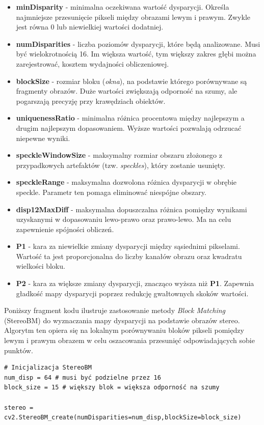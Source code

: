 \documentclass[magisterska]{pracadypl}
\begin{document}
\begin{itemize}
    \item \textbf{minDisparity} - minimalna oczekiwana wartość dysparycji. Określa najmniejsze przesunięcie pikseli między obrazami lewym i prawym. Zwykle jest równa 0 lub niewielkiej wartości dodatniej.
    \item \textbf{numDisparities} - liczba poziomów dysparycji, które będą analizowane. Musi być wielokrotnością 16. Im większa wartość, tym większy zakres głębi można zarejestrować, kosztem wydajności obliczeniowej.
    \item \textbf{blockSize} - rozmiar bloku (\textit{okna}), na podstawie którego porównywane są fragmenty obrazów. Duże wartości zwiększają odporność na szumy, ale pogarszają precyzję przy krawędziach obiektów.
    \item \textbf{uniquenessRatio} - minimalna różnica procentowa między najlepszym a drugim najlepszym dopasowaniem. Wyższe wartości pozwalają odrzucać niepewne wyniki.
    \item \textbf{speckleWindowSize} - maksymalny rozmiar obszaru złożonego z przypadkowych artefaktów (tzw. \textit{speckles}), który zostanie usunięty.
    \item \textbf{speckleRange} - maksymalna dozwolona różnica dysparycji w obrębie speckle. Parametr ten pomaga eliminować niespójne obszary.
    \item \textbf{disp12MaxDiff} - maksymalna dopuszczalna różnica pomiędzy wynikami uzyskanymi w dopasowaniu lewo-prawo oraz prawo-lewo. Ma na celu zapewnienie spójności obliczeń.
    \item \textbf{P1} - kara za niewielkie zmiany dysparycji między sąsiednimi pikselami. Wartość ta jest proporcjonalna do liczby kanałów obrazu oraz kwadratu wielkości bloku.
    \item \textbf{P2} - kara za większe zmiany dysparycji, znacząco wyższa niż \textbf{P1}. Zapewnia gładkość mapy dysparycji poprzez redukcję gwałtownych skoków wartości.
\end{itemize}

Poniższy fragment kodu ilustruje zastosowanie metody \textit{Block Matching} (StereoBM) do wyznaczania mapy dysparycji na podstawie obrazów stereo. Algorytm ten opiera się na lokalnym porównywaniu bloków pikseli pomiędzy lewym i prawym obrazem w celu oszacowania przesunięć odpowiadających sobie punktów.  

\begin{lstlisting}[style=mypython]
# Inicjalizacja StereoBM
num_disp = 64 # musi być podzielne przez 16
block_size = 15 # większy blok = większa odporność na szumy

stereo = cv2.StereoBM_create(numDisparities=num_disp,blockSize=block_size)
\end{lstlisting}
\end{document}
